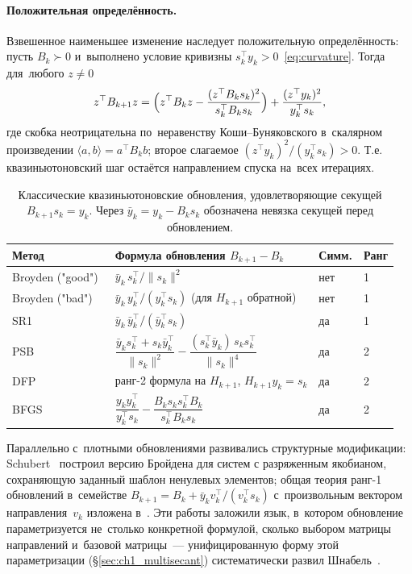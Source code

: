 \paragraph{Положительная определённость.}
Взвешенное наименьшее изменение наследует положительную определённость:
пусть $B_k \succ 0$ и~выполнено условие кривизны
$s_k^\top y_k > 0$~\eqref{eq:curvature}. Тогда для~любого $z \neq 0$
\[
  z^\top B_{k+1} z
   = \Bigl(z^\top B_k z - \frac{(z^\top B_k s_k)^2}{s_k^\top B_k s_k}\Bigr)
     + \frac{(z^\top y_k)^2}{y_k^\top s_k},
\]
где скобка неотрицательна по~неравенству Коши--Буняковского в~скалярном
произведении $\langle a,b\rangle = a^\top B_k b$; второе слагаемое 
$(z^\top y_k)^2/(y_k^\top s_k) > 0$. Т.е. квазиньютоновский шаг остаётся направлением
спуска на~всех итерациях.



\begin{table}[H]
\centering
\caption{Классические квазиньютоновские обновления, удовлетворяющие
секущей $B_{k+1}s_k = y_k$. Через $\bar y_k = y_k - B_k s_k$
обозначена невязка секущей перед обновлением.}\label{tab:ch1_qn}
\renewcommand{\arraystretch}{1.35}
\begin{tabular}{@{}p{3.1cm} p{6.2cm} p{1.6cm} p{1.6cm}@{}}
\toprule
Метод & Формула обновления $B_{k+1} - B_k$ & Симм. & Ранг \\
\midrule
Broyden ("good")~\cite{broyden1965}
  & $\bar y_k\, s_k^\top / \|s_k\|^2$
  & нет & 1 \\
Broyden ("bad")~\cite{broyden1965}
  & $\bar y_k\, y_k^\top / (y_k^\top s_k)$ (для $H_{k+1}$ обратной)
  & нет & 1 \\
SR1~\cite{conn1991,bfgs}
  & $\bar y_k\,\bar y_k^\top / (\bar y_k^\top s_k)$
  & да & 1 \\
PSB~\cite{powell1970,dennis1977}
  & $\dfrac{\bar y_k s_k^\top + s_k \bar y_k^\top}{\|s_k\|^2}
     - \dfrac{(s_k^\top \bar y_k)\, s_k s_k^\top}{\|s_k\|^4}$
  & да & 2 \\
DFP~\cite{davidon1991,dennis1977}
  & ранг-2 формула на $H_{k+1}$, $H_{k+1} y_k = s_k$
  & да & 2 \\
BFGS~\cite{bfgs}
  & $\dfrac{y_k y_k^\top}{y_k^\top s_k} - \dfrac{B_k s_k s_k^\top B_k}{s_k^\top B_k s_k}$
  & да & 2 \\
\bottomrule
\end{tabular}
\end{table}

Параллельно с~плотными обновлениями развивались структурные
модификации: Schubert~\cite{schubert1970} построил версию Бройдена для
систем с разряженным якобианом, сохраняющую заданный шаблон ненулевых
элементов; общая теория ранг-1 обновлений в~семействе
$B_{k+1} = B_k + \bar y_k v_k^\top/(v_k^\top s_k)$ с~произвольным
вектором направления~$v_k$ изложена в~\cite{gay1979}. Эти работы
заложили язык, в~котором обновление параметризуется не~столько
конкретной формулой, сколько выбором матрицы направлений и~базовой
матрицы~--- унифицированную форму этой параметризации
(\S\ref{sec:ch1_multisecant}) систематически развил
Шнабель~\cite{schnabel1983}.


